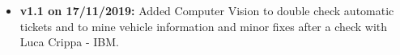 \begin{itemize}
\item \textbf{v1.1 on 17/11/2019:} Added Computer Vision to double check automatic tickets and to mine vehicle information and minor fixes after a check with Luca Crippa - IBM.
\end{itemize}